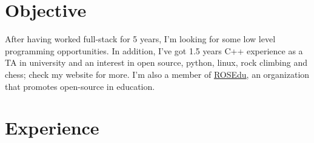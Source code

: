 \documentclass[line, margin]{resume}
\begin{document}
\renewcommand{\namefont}{ \LARGE \bf }


\address{\href{mailto:andrei@linux.com}{andrei@linux.com}}
\address{\href{http://andreipetre.ro}{andreipetre.ro}}

\begin{resume}



    \section{Objective}

After having worked full-stack for 5 years, I'm looking for some low level programming opportunities. In addition, I've got 1.5 years C++ experience as a TA in university and an interest in open source, python, linux, rock climbing and chess; check my website for more. I'm also a member of \href{http://rosedu.org}{ROSEdu}, an organization that promotes open-source in education.

\section{Experience}


\end{resume}
\end{document}
